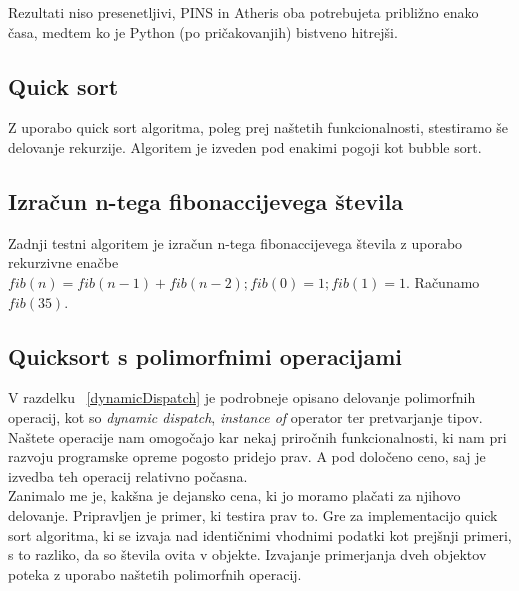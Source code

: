 \documentclass[a4paper, 12p]{book}
\begin{document}
Rezultati niso presenetljivi, PINS in Atheris oba potrebujeta približno enako časa, medtem ko je Python (po pričakovanjih) bistveno hitrejši.

\subsection{Quick sort}

Z uporabo quick sort algoritma, poleg prej naštetih funkcionalnosti, stestiramo še delovanje rekurzije. Algoritem je izveden pod enakimi pogoji kot bubble sort. \\


\subsection{Izračun n-tega fibonaccijevega števila}

Zadnji testni algoritem je izračun n-tega fibonaccijevega števila z uporabo rekurzivne enačbe
$fib(n) = fib(n - 1) + fib(n - 2) ; fib(0) = 1; fib(1) = 1$. Računamo $fib(35)$. \\


\subsection{Quicksort s polimorfnimi operacijami}

V razdelku ~\ref{dynamicDispatch} je podrobneje opisano delovanje polimorfnih operacij, kot so \textit{dynamic dispatch}, \textit{instance of} operator ter pretvarjanje tipov. Naštete operacije nam omogočajo kar nekaj priročnih funkcionalnosti, ki nam pri razvoju programske opreme pogosto pridejo prav. A pod določeno ceno, saj je izvedba teh operacij relativno počasna. \\
\indent Zanimalo me je, kakšna je dejansko cena, ki jo moramo plačati za njihovo delovanje. Pripravljen je primer, ki testira prav to.
Gre za implementacijo quick sort algoritma, ki se izvaja nad identičnimi vhodnimi podatki kot prejšnji primeri, s to razliko, da so števila ovita v objekte. Izvajanje primerjanja dveh objektov poteka z uporabo naštetih polimorfnih operacij. \\
\end{document}
